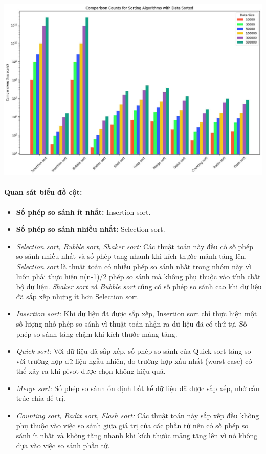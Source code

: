     \newpage
    \includegraphics[width = 1\linewidth]{img/experiment/comparison/COMPARISON_SORTED.jpg}
    \paragraph{Quan sát biểu đồ cột:}
    \begin{itemize}
        \item \textbf{Số phép so sánh ít nhất:} Insertion sort.
        \item \textbf{Số phép so sánh nhiều nhất:} Selection sort.
        \item \textit{Selection sort, Bubble sort, Shaker sort:} Các thuật toán này đều có số phép so sánh nhiều nhất và số phép tang nhanh khi kích thước mảnh tăng lên. \textit{Selection sort} là thuật toán có nhiều phép so sánh nhất trong nhóm này vì luôn phải thực hiện n(n-1)/2 phép so sánh mà không phụ thuộc vào tính chất bộ dữ liệu. \textit{Shaker sort và Bubble sort} cũng có số phép so sánh cao khi dữ liệu đã sắp xếp nhưng ít hơn Selection sort
        \item \textit{Insertion sort: }Khi dữ liệu đã được sắp xếp, Insertion sort chỉ thực hiện một số lượng nhỏ phép so sánh vì thuật toán nhận ra dữ liệu đã có thứ tự. Số phép so sánh tăng chậm khi kích thước mảng tăng.
        \item \textit{Quick sort:} Với dữ liệu đã sắp xếp, số phép so sánh của Quick sort tăng so với trường hợp dữ liệu ngẫu nhiên, do trường hợp xấu nhất (worst-case) có thể xảy ra khi pivot được chọn không hiệu quả.
        \item \textit{Merge sort: }Số phép so sánh ổn định bất kể dữ liệu đã được sắp xếp, nhờ cấu trúc chia để trị.
        \item \textit{Counting sort, Radix sort, Flash sort:} Các thuật toán này sắp xếp đều không phụ thuộc vào việc so sánh giữa giá trị của các phần tử nên có số phép so sánh ít nhất và không tăng nhanh khi kích thước mảng tăng lên vì nó không dựa vào việc so sánh phần tử.
    \end{itemize}


